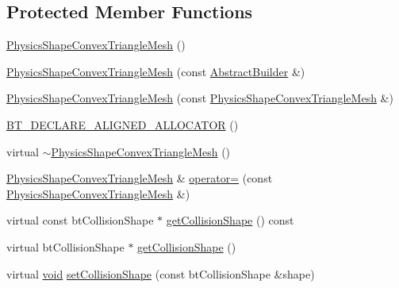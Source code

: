 \subsection*{Protected Member Functions}
\begin{DoxyCompactItemize}
\item 
\mbox{\hyperlink{classnjli_1_1_physics_shape_convex_triangle_mesh_ab5f351b3bf15c7bcb636031dbe8914b1}{Physics\+Shape\+Convex\+Triangle\+Mesh}} ()
\item 
\mbox{\hyperlink{classnjli_1_1_physics_shape_convex_triangle_mesh_af3a35d1c8c12749848c19e9aa72b966e}{Physics\+Shape\+Convex\+Triangle\+Mesh}} (const \mbox{\hyperlink{classnjli_1_1_abstract_builder}{Abstract\+Builder}} \&)
\item 
\mbox{\hyperlink{classnjli_1_1_physics_shape_convex_triangle_mesh_ad01fa32852ca4102a072a287e19e31de}{Physics\+Shape\+Convex\+Triangle\+Mesh}} (const \mbox{\hyperlink{classnjli_1_1_physics_shape_convex_triangle_mesh}{Physics\+Shape\+Convex\+Triangle\+Mesh}} \&)
\item 
\mbox{\hyperlink{classnjli_1_1_physics_shape_convex_triangle_mesh_a205939fd6060adbe495dbaf58e036324}{B\+T\+\_\+\+D\+E\+C\+L\+A\+R\+E\+\_\+\+A\+L\+I\+G\+N\+E\+D\+\_\+\+A\+L\+L\+O\+C\+A\+T\+OR}} ()
\item 
virtual \mbox{\hyperlink{classnjli_1_1_physics_shape_convex_triangle_mesh_a72767fab051b89e5edac60ba503785ac}{$\sim$\+Physics\+Shape\+Convex\+Triangle\+Mesh}} ()
\item 
\mbox{\hyperlink{classnjli_1_1_physics_shape_convex_triangle_mesh}{Physics\+Shape\+Convex\+Triangle\+Mesh}} \& \mbox{\hyperlink{classnjli_1_1_physics_shape_convex_triangle_mesh_a31512f7194eb3b311397c58cfa4613ea}{operator=}} (const \mbox{\hyperlink{classnjli_1_1_physics_shape_convex_triangle_mesh}{Physics\+Shape\+Convex\+Triangle\+Mesh}} \&)
\item 
virtual const bt\+Collision\+Shape $\ast$ \mbox{\hyperlink{classnjli_1_1_physics_shape_convex_triangle_mesh_aacb06bac718d0ad96b0bf2b2b5f4d3dd}{get\+Collision\+Shape}} () const
\item 
virtual bt\+Collision\+Shape $\ast$ \mbox{\hyperlink{classnjli_1_1_physics_shape_convex_triangle_mesh_a86d32058509c5e63b3ec98c758648c34}{get\+Collision\+Shape}} ()
\item 
virtual \mbox{\hyperlink{_thread_8h_af1e856da2e658414cb2456cb6f7ebc66}{void}} \mbox{\hyperlink{classnjli_1_1_physics_shape_convex_triangle_mesh_a5fb1e1a0a980e346a919d155ac5c2c82}{set\+Collision\+Shape}} (const bt\+Collision\+Shape \&shape)
\end{DoxyCompactItemize}
